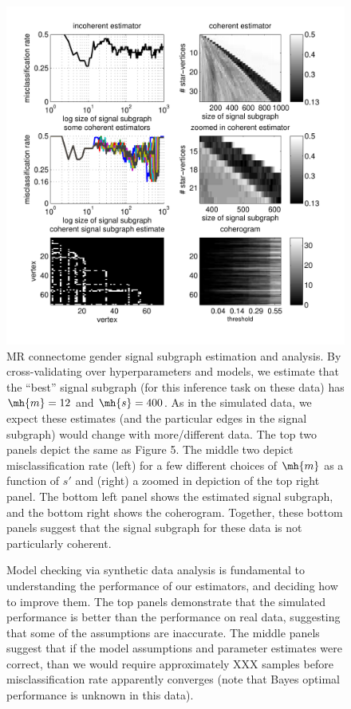 \documentclass[10pt,journal,cspaper,compsoc]{IEEEtran}
\begin{document}
\begin{figure}[htbp]
	\centering
		\includegraphics[width=0.8\linewidth]{../figs/BLSA0317_Count_Lhats_results.pdf}
	\caption{MR connectome gender signal subgraph estimation and analysis. By cross-validating over hyperparameters and models, we estimate that the ``best'' signal subgraph (for this inference task on these data) has $\mh{m}=12$ and $\mh{s}=400$.  As in the simulated data, we expect these estimates (and the particular edges in the signal subgraph) would change with more/different data. The top two panels depict the same as Figure 5.  The middle two depict misclassification rate (left) for a few different choices of $\mh{m}$ as a function of $s'$ and (right) a zoomed in depiction of the top right panel. The bottom left panel shows the estimated signal subgraph, and the bottom right shows the coherogram.  Together, these bottom panels suggest that the signal subgraph for these data is not particularly coherent.}
	\label{fig:data}
\end{figure}


\begin{figure}[tb!]
	\centering
	\caption{Model checking via synthetic data analysis is fundamental to understanding the performance of our estimators, and deciding how to improve them.  The top panels demonstrate that the simulated performance is better than the performance on real data, suggesting that some of the assumptions are inaccurate.  The middle panels suggest that if the model assumptions and parameter estimates were correct, than we would require approximately XXX samples before misclassification rate apparently converges (note that Bayes optimal performance is unknown in this data).}
	\label{fig:synthetic}
\end{figure}
\end{document}
